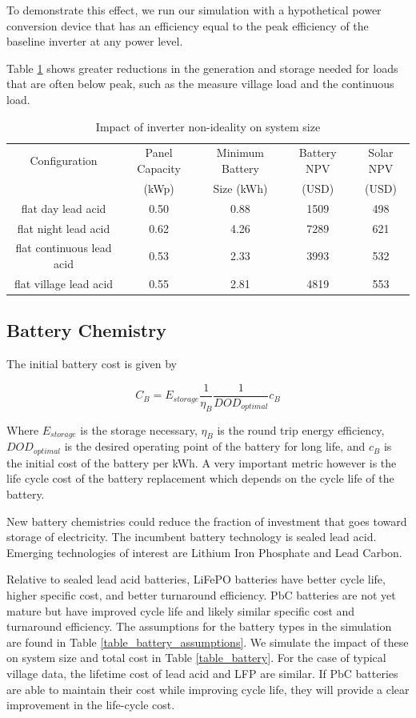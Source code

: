 \documentclass[conference]{IEEEtran}
\begin{document}
To demonstrate this effect, we run our simulation with
a hypothetical power conversion device that has an
efficiency equal to the peak efficiency of the baseline
inverter at any power level.

Table \ref{table_inverter} shows greater reductions
in the generation and storage needed for loads that
are often below peak, such as the measure village load
and the continuous load.

\begin{table}
\centering
\begin{tabular}{c c c c c}
Configuration & Panel Capacity & Minimum Battery & Battery NPV & Solar NPV \\
              & (kWp)          & Size (kWh)      & (USD)       & (USD)     \\
\hline
flat day lead acid             & 0.50 & 0.88 & 1509 & 498 \\
flat night lead acid           & 0.62 & 4.26 & 7289 & 621 \\
flat continuous lead acid      & 0.53 & 2.33 & 3993 & 532 \\
flat village lead acid         & 0.55 & 2.81 & 4819 & 553 \\
\end{tabular}
\caption{Impact of inverter non-ideality on system size}
\label{table_inverter}
\end{table}

\subsection{Battery Chemistry}

The initial battery cost is given by

$$ C_B = E_{storage} \frac{1}{\eta_B} \frac{1}{DOD_{optimal}} c_B $$

Where $E_{storage}$ is the storage necessary, $\eta_B$ is the
round trip energy efficiency, $DOD_{optimal}$ is the desired
operating point of the battery for long life, and $c_B$ is the
initial cost of the battery per kWh.
A very important metric however is the life cycle cost of the 
battery replacement which depends on the cycle life of the battery.

New battery chemistries could reduce the fraction of investment
that goes toward storage of electricity.
The incumbent battery technology is sealed lead acid.
Emerging technologies of interest are Lithium Iron Phosphate
and Lead Carbon.

Relative to sealed lead acid batteries, LiFePO batteries 
have better cycle life, higher specific cost, and better
turnaround efficiency.
PbC batteries are not yet mature but have improved cycle
life and likely similar specific cost and turnaround
efficiency.
The assumptions for the battery types in the simulation
are found in Table \ref{table_battery_assumptions}.
We simulate the impact of these on system size and total cost
in Table \ref{table_battery}.
For the case of typical village data, the lifetime cost of 
lead acid and LFP are similar.
If PbC batteries are able to maintain their cost while
improving cycle life, they will provide a clear improvement
in the life-cycle cost.
\end{document}

